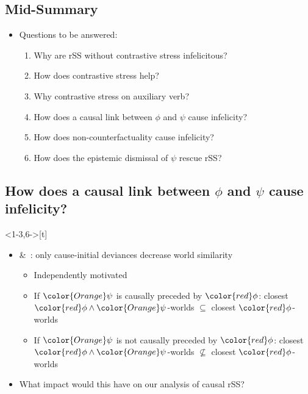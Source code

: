 \setcounter{subsection}{2}
\subsection*{Mid-Summary}
\begin{frame}[t]
\subsectionpage\vskip 9pt
    \begin{itemize}
        \item<1-> Questions to be answered:\vskip 18pt
            \begin{enumerate}
                \item Why are rSS without contrastive stress infelicitous? {\color{seeblau100!75!black}\checkmark}\vskip 9pt
                \item How does contrastive stress help? {\color{seeblau100!75!black}\checkmark}\vskip 9pt
                \item Why contrastive stress on auxiliary verb? {\color{seeblau100!75!black}\checkmark}\vskip 9pt
                \item How does a causal link between {\color{red}$\phi$} and {\color{Orange}$\psi$} cause infelicity?\vskip 9pt
                \item How does non-counterfactuality cause infelicity?\vskip 9pt
                \item How does the epistemic dismissal of {\color{Orange}$\psi$} rescue rSS?
            \end{enumerate}
	\end{itemize}
\end{frame}

\subsection{How does a causal link between $\phi$ and $\psi$ cause infelicity?}
\begin{frame}<1-3,6->[t]
\subsectionpage\vskip 9pt
    \begin{itemize}
        \item<2-> \citet{Bennett2003} \&\ \citet{Arregui2009}: only cause-initial deviances decrease world similarity\vskip 4.5pt
            \begin{itemize}
                \item<3-> Independently motivated\vskip 4.5pt
                \item<6-> If ${\color{Orange}\psi}$ is causally preceded by ${\color{red}\phi}$: closest ${\color{red}\phi}\land{\color{Orange}\psi}$-worlds $\subseteq$ closest ${\color{red}\phi}$-worlds
                \item<7-> If ${\color{Orange}\psi}$ is not causally preceded by ${\color{red}\phi}$: closest ${\color{red}\phi}\land{\color{Orange}\psi}$-worlds $\not\subseteq$ closest ${\color{red}\phi}$-worlds
            \end{itemize}\vskip 18pt
        \item<8-> What impact would this have on our analysis of causal rSS?
    \end{itemize}
\end{frame}

